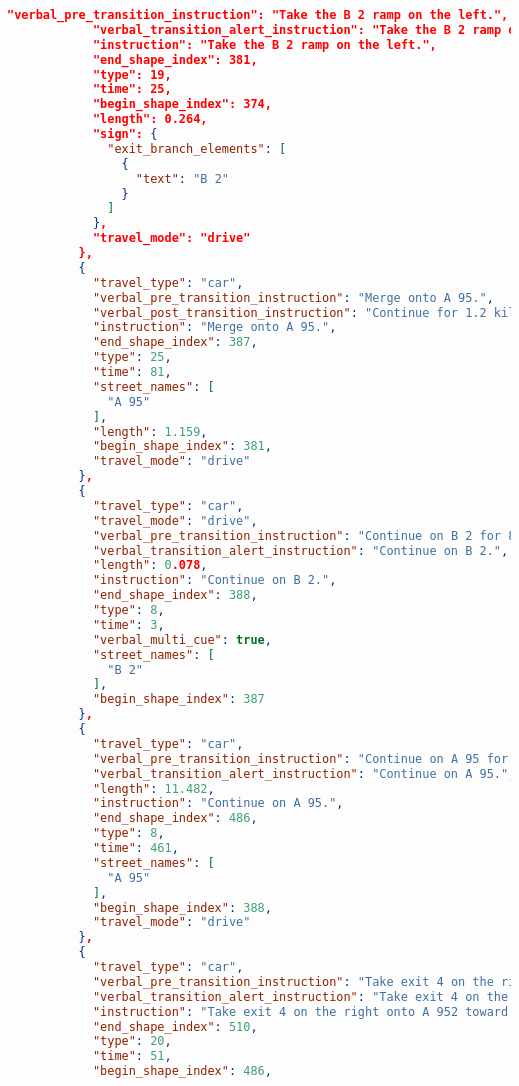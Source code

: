 \begin{lstlisting}[language=json,breaklines=true]
            "verbal_pre_transition_instruction": "Take the B 2 ramp on the left.",
            "verbal_transition_alert_instruction": "Take the B 2 ramp on the left.",
            "instruction": "Take the B 2 ramp on the left.",
            "end_shape_index": 381,
            "type": 19,
            "time": 25,
            "begin_shape_index": 374,
            "length": 0.264,
            "sign": {
              "exit_branch_elements": [
                {
                  "text": "B 2"
                }
              ]
            },
            "travel_mode": "drive"
          },
          {
            "travel_type": "car",
            "verbal_pre_transition_instruction": "Merge onto A 95.",
            "verbal_post_transition_instruction": "Continue for 1.2 kilometers.",
            "instruction": "Merge onto A 95.",
            "end_shape_index": 387,
            "type": 25,
            "time": 81,
            "street_names": [
              "A 95"
            ],
            "length": 1.159,
            "begin_shape_index": 381,
            "travel_mode": "drive"
          },
          {
            "travel_type": "car",
            "travel_mode": "drive",
            "verbal_pre_transition_instruction": "Continue on B 2 for 80 meters. Then Continue on A 95.",
            "verbal_transition_alert_instruction": "Continue on B 2.",
            "length": 0.078,
            "instruction": "Continue on B 2.",
            "end_shape_index": 388,
            "type": 8,
            "time": 3,
            "verbal_multi_cue": true,
            "street_names": [
              "B 2"
            ],
            "begin_shape_index": 387
          },
          {
            "travel_type": "car",
            "verbal_pre_transition_instruction": "Continue on A 95 for 11.5 kilometers.",
            "verbal_transition_alert_instruction": "Continue on A 95.",
            "length": 11.482,
            "instruction": "Continue on A 95.",
            "end_shape_index": 486,
            "type": 8,
            "time": 461,
            "street_names": [
              "A 95"
            ],
            "begin_shape_index": 388,
            "travel_mode": "drive"
          },
          {
            "travel_type": "car",
            "verbal_pre_transition_instruction": "Take exit 4 on the right onto A 9 52 toward Starnberg.",
            "verbal_transition_alert_instruction": "Take exit 4 on the right.",
            "instruction": "Take exit 4 on the right onto A 952 toward Starnberg.",
            "end_shape_index": 510,
            "type": 20,
            "time": 51,
            "begin_shape_index": 486,

\end{lstlisting}
